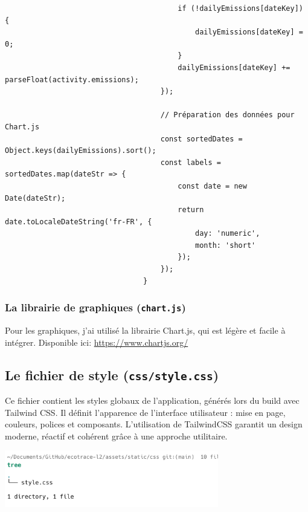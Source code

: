 \documentclass[a4paper,11pt]{article}
\begin{document}
\begin{enumerate}
\begin{tcolorbox}[colback=lightgray!6, colframe=black, left=-65mm, right=5mm, top=2mm, bottom=0mm, boxrule=0.1mm]
\begin{verbatim}
                                        if (!dailyEmissions[dateKey]) {
                                            dailyEmissions[dateKey] = 0;
                                        }
                                        dailyEmissions[dateKey] += parseFloat(activity.emissions);
                                    });

                                    // Préparation des données pour Chart.js
                                    const sortedDates = Object.keys(dailyEmissions).sort();
                                    const labels = sortedDates.map(dateStr => {
                                        const date = new Date(dateStr);
                                        return date.toLocaleDateString('fr-FR', {
                                            day: 'numeric',
                                            month: 'short'
                                        });
                                    });
                                }
                            \end{verbatim}
                        \end{tcolorbox}
                \end{enumerate}

                \subsubsection{La librairie de graphiques (\texttt{chart.js})}
                \noindent Pour les graphiques, j'ai utilisé la librairie Chart.js, qui est légère et facile à intégrer. Disponible ici: \url{https://www.chartjs.org/}

            \subsection{Le fichier de style (\texttt{css/style.css})}
                \noindent Ce fichier contient les styles globaux de l’application, générés lors du build avec Tailwind CSS. Il définit l’apparence de l’interface utilisateur : mise en page, couleurs, polices et composants. L’utilisation de TailwindCSS garantit un design moderne, réactif et cohérent grâce à une approche utilitaire.

                \begin{center}
                    \includegraphics[width=0.7\textwidth]{captures/templates_et_static/static/css/img1.png}
                \end{center}
\end{document}
